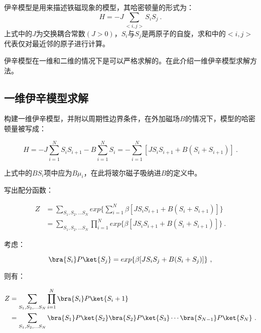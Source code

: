 
\begin{issues}
\issueDraft
\issueMissDepend
{}
\end{issues}



伊辛模型是用来描述铁磁现象的模型，其哈密顿量的形式为：
\begin{equation}
H=-J\sum\limits_{<i,j>}S_iS_j~.
\end{equation}
上式中的$J$为交换耦合常数$(J>0)$，$S_i$与$S_j$是两原子的自旋，求和中的$<i,j>$代表仅对最近邻的原子进行计算。

伊辛模型在一维和二维的情况下是可以严格求解的。在此介绍一维伊辛模型求解方法。

\subsection{一维伊辛模型求解}

构建一维伊辛模型，并附以周期性边界条件，在外加磁场$B$的情况下，模型的哈密顿量被写成：

\begin{equation}
H=-J\sum\limits_{i=1}^NS_iS_{i+1}-B\sum\limits_{i=1}^NS_i=-\sum\limits_{i=1}^N[JS_iS_{i+1}+B(S_i+S_{i+1})]~.
\end{equation}

上式中的$BS_i$项中应为$B\mu_i$，在此将玻尔磁子吸纳进$B$的定义中。

写出配分函数：

\begin{align}
Z&=\sum\limits_{S_1,S_2,...S_N}exp\{\sum\limits_{i=1}^N\beta[JS_iS_{i+1}+B(S_i+S_{i+1})]\} \\
&=\sum\limits_{S_1,S_2,...S_N}\prod\limits_{i=1}^N exp\{\beta[JS_iS_{i+1}+B(S_i+S_{i+1})]\}~.
\end{align}

考虑：

\begin{equation}
\bra{S_i}P\ket{S_j}=exp\{\beta[JS_iS_{j}+B(S_i+S_{j})]\}~,
\end{equation}

则有：

\begin{align}
Z&=\sum\limits_{S_1,S_2,...S_N}\prod\limits_{i=1}^N\bra{S_i}P\ket{S_i+1} \\
&=\sum\limits_{S_1,S_2,...S_N}\bra{S_1}P\ket{S_2} \bra{S_2}P\ket{S_3}\cdots\bra{S_{N-1}}P\ket{S_N} ~.
\end{align}

